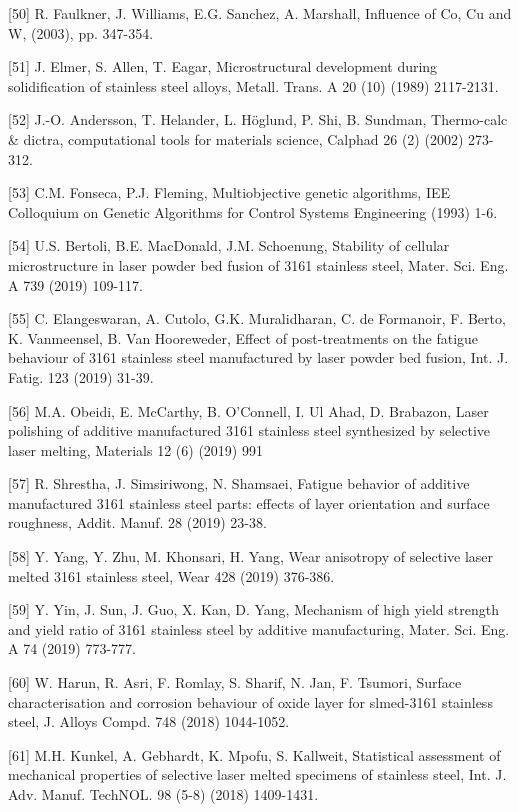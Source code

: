 \documentclass[10pt]{article}
\begin{document}
[50] R. Faulkner, J. Williams, E.G. Sanchez, A. Marshall, Influence of Co, Cu and W, (2003), pp. 347-354.

[51] J. Elmer, S. Allen, T. Eagar, Microstructural development during solidification of stainless steel alloys, Metall. Trans. A 20 (10) (1989) 2117-2131.

[52] J.-O. Andersson, T. Helander, L. Höglund, P. Shi, B. Sundman, Thermo-calc \& dictra, computational tools for materials science, Calphad 26 (2) (2002) 273-312.

[53] C.M. Fonseca, P.J. Fleming, Multiobjective genetic algorithms, IEE Colloquium on Genetic Algorithms for Control Systems Engineering (1993) 1-6.

[54] U.S. Bertoli, B.E. MacDonald, J.M. Schoenung, Stability of cellular microstructure in laser powder bed fusion of 3161 stainless steel, Mater. Sci. Eng. A 739 (2019) 109-117.

[55] C. Elangeswaran, A. Cutolo, G.K. Muralidharan, C. de Formanoir, F. Berto, K. Vanmeensel, B. Van Hooreweder, Effect of post-treatments on the fatigue behaviour of 3161 stainless steel manufactured by laser powder bed fusion, Int. J. Fatig. 123 (2019) 31-39.

[56] M.A. Obeidi, E. McCarthy, B. O'Connell, I. Ul Ahad, D. Brabazon, Laser polishing of additive manufactured 3161 stainless steel synthesized by selective laser melting, Materials 12 (6) (2019) 991

[57] R. Shrestha, J. Simsiriwong, N. Shamsaei, Fatigue behavior of additive manufactured 3161 stainless steel parts: effects of layer orientation and surface roughness, Addit. Manuf. 28 (2019) 23-38.

[58] Y. Yang, Y. Zhu, M. Khonsari, H. Yang, Wear anisotropy of selective laser melted 3161 stainless steel, Wear 428 (2019) 376-386.

[59] Y. Yin, J. Sun, J. Guo, X. Kan, D. Yang, Mechanism of high yield strength and yield ratio of 3161 stainless steel by additive manufacturing, Mater. Sci. Eng. A 74 (2019) 773-777.

[60] W. Harun, R. Asri, F. Romlay, S. Sharif, N. Jan, F. Tsumori, Surface characterisation and corrosion behaviour of oxide layer for slmed-3161 stainless steel, J. Alloys Compd. 748 (2018) 1044-1052.

[61] M.H. Kunkel, A. Gebhardt, K. Mpofu, S. Kallweit, Statistical assessment of mechanical properties of selective laser melted specimens of stainless steel, Int. J. Adv. Manuf. TechNOL. 98 (5-8) (2018) 1409-1431.
\end{document}
